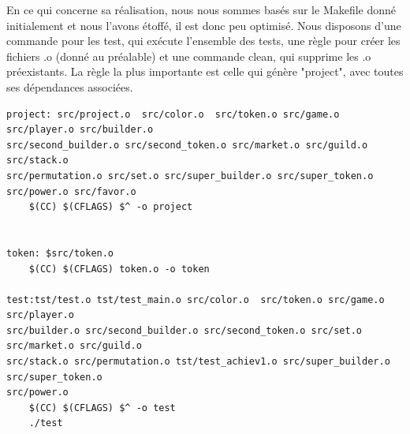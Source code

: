 \documentclass{article}
\begin{document}
    \hspace{1em} En ce qui concerne sa réalisation, nous nous sommes basés sur le Makefile donné initialement et nous l'avons étoffé, il est donc peu optimisé. Nous disposons d'une commande pour les test, qui exécute l'ensemble des tests,  une règle pour créer les fichiers .o (donné au préalable) et une commande clean, qui supprime les .o préexistants. La règle la plus importante est celle qui génère "project", avec toutes ses dépendances associées. 
    
\begin{lstlisting}[frame=single, caption={Commande de compilation},label=compilation]
project: src/project.o  src/color.o  src/token.o src/game.o src/player.o src/builder.o
src/second_builder.o src/second_token.o src/market.o src/guild.o src/stack.o 
src/permutation.o src/set.o src/super_builder.o src/super_token.o src/power.o src/favor.o
	$(CC) $(CFLAGS) $^ -o project


token: $src/token.o
	$(CC) $(CFLAGS) token.o -o token

test:tst/test.o tst/test_main.o src/color.o  src/token.o src/game.o src/player.o 
src/builder.o src/second_builder.o src/second_token.o src/set.o src/market.o src/guild.o 
src/stack.o src/permutation.o tst/test_achiev1.o src/super_builder.o src/super_token.o
src/power.o
	$(CC) $(CFLAGS) $^ -o test
	./test

\end{lstlisting} 
\end{document}
